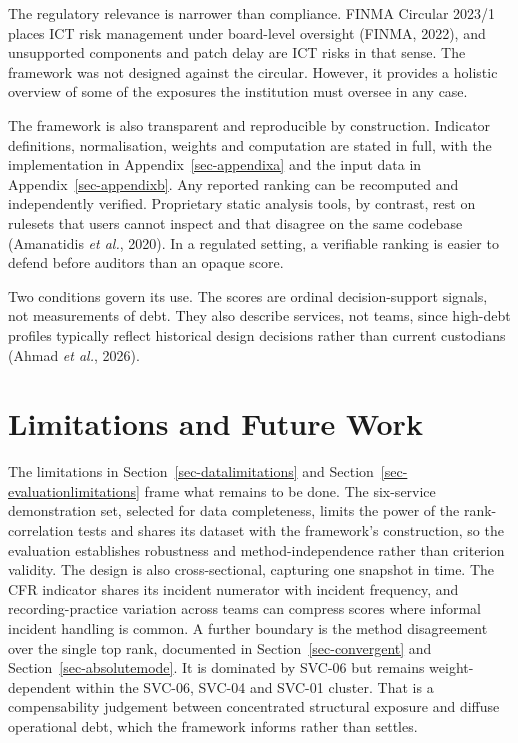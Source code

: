 \documentclass[
  12pt,
  letterpaper,
  12pt,
  oneside,
  english,
  onehalfspacing,
  headsepline]{MastersDoctoralThesis}
\begin{document}
The regulatory relevance is narrower than compliance. FINMA Circular
2023/1 places ICT risk management under board-level oversight (FINMA,
2022), and unsupported components and patch delay are ICT risks in that
sense. The framework was not designed against the circular. However, it
provides a holistic overview of some of the exposures the institution
must oversee in any case.

The framework is also transparent and reproducible by construction.
Indicator definitions, normalisation, weights and computation are stated
in full, with the implementation in Appendix~\ref{sec-appendixa} and the
input data in Appendix~\ref{sec-appendixb}. Any reported ranking can be
recomputed and independently verified. Proprietary static analysis
tools, by contrast, rest on rulesets that users cannot inspect and that
disagree on the same codebase (Amanatidis \emph{et al.}, 2020). In a
regulated setting, a verifiable ranking is easier to defend before
auditors than an opaque score.

Two conditions govern its use. The scores are ordinal decision-support
signals, not measurements of debt. They also describe services, not
teams, since high-debt profiles typically reflect historical design
decisions rather than current custodians (Ahmad \emph{et al.}, 2026).

\section{Limitations and Future Work}\label{limitations-and-future-work}

The limitations in Section~\ref{sec-datalimitations} and
Section~\ref{sec-evaluationlimitations} frame what remains to be done.
The six-service demonstration set, selected for data completeness,
limits the power of the rank-correlation tests and shares its dataset
with the framework's construction, so the evaluation establishes
robustness and method-independence rather than criterion validity. The
design is also cross-sectional, capturing one snapshot in time. The CFR
indicator shares its incident numerator with incident frequency, and
recording-practice variation across teams can compress scores where
informal incident handling is common. A further boundary is the method
disagreement over the single top rank, documented in
Section~\ref{sec-convergent} and Section~\ref{sec-absolutemode}. It is
dominated by SVC-06 but remains weight-dependent within the SVC-06,
SVC-04 and SVC-01 cluster. That is a compensability judgement between
concentrated structural exposure and diffuse operational debt, which the
framework informs rather than settles.
\end{document}
